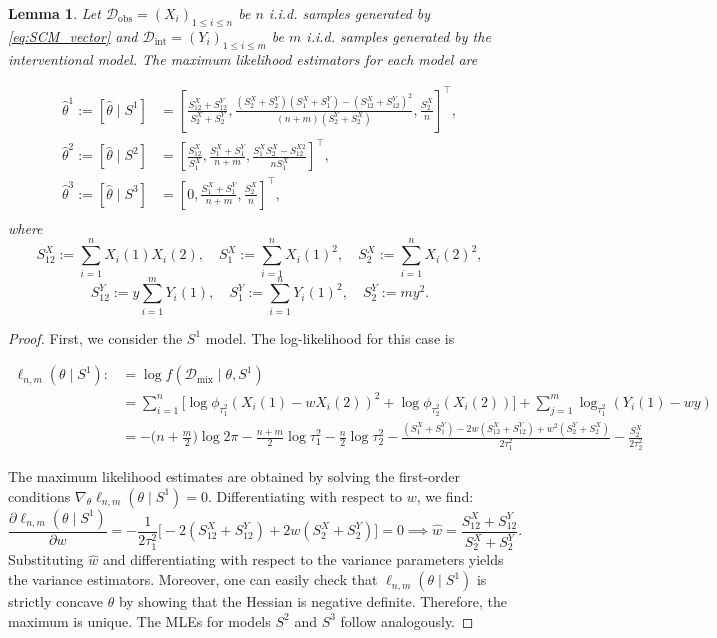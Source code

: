\documentclass[accepted]{uai2026} %
\newcommand{\train}{\mathcal{D}}
\newcommand{\obsdata}{\train_{\text{obs}}}
\newcommand{\mixdata}{\train_{\text{mix}}}
\newcommand{\intdata}{\train_{\text{int}}}
\def\transpose{\intercal}
\newtheorem{lemma}{Lemma}[section]
\theoremstyle{boldremark}
\begin{document}
\begin{lemma}
    \label{lemma:MLEs_ident}
    Let $\obsdata = (X_i)_{1\leq i \leq n}$ be $n$ i.i.d. samples generated by \eqref{eq:SCM_vector} and $\intdata = (Y_i)_{1\leq i \leq m}$ be $m$ i.i.d. samples generated by the interventional model. The maximum likelihood estimators for each model are

    \begin{align*}
        \hat{\theta}^1:= [\hat{\theta} \mid S^1] &= \left[ \frac{S^X_{12}+S_{12}^Y}{S_2^X+S_2^Y},  \frac{(S_2^X+S_2^Y)(S_1^X+S_1^Y)-(S_{12}^X+S_{12}^Y)^2}{(n+m)(S_2^Y+S_2^X)}, \frac{S_2^X}{n}\right]^\transpose,\\
        \hat{\theta}^2:= [\hat{\theta} \mid S^2]  &= \left[\frac{S_{12}^X}{S_1^X}, \frac{S_{1}^X+S_{1}^Y}{n+m}, \frac{S_1^XS_2^X-S_{12}^{X2}}{nS_1^X} \right]^\transpose,\\
        \hat{\theta}^3:= [\hat{\theta} \mid S^3] &= \left[ 0, \frac{S_1^X+S_1^Y}{n+m}, \frac{S_2^X}{n}\right]^\transpose,\\
    \end{align*}
    where
    \begin{equation}
        S^X_{12} := \sum_{i=1}^n X_i(1)X_i(2), \quad S^X_1:= \sum_{i=1}^n X_i(1)^2, \quad S^X_2:= \sum_{i=1}^n X_i(2)^2,
        \label{eq:MLE_interv_X}
    \end{equation}
    \begin{equation}
        S^Y_{12} := y\sum_{i=1}^m Y_i(1), \quad S^Y_1:= \sum_{i=1}^n Y_i(1)^2, \quad S^Y_2:= my^2.
        \label{eq:MLE_interv_Y}
    \end{equation}
\end{lemma}
\begin{proof}
First, we consider the $S^1$ model. The log-likelihood for this case is

\begin{align*}
    \ell_{n,m}(\theta \mid S^1) :&= \log f(\mixdata\mid \theta, S^1) \\
    &= \sum_{i=1}^n \Big[ \log\phi_{\tau_1^2}(X_i(1)-wX_i(2))^2 + \log \phi_{\tau_2^2}(X_i(2)) \Big] + \sum_{j=1}^m \log_{\tau_1^2}(Y_i(1) - wy) \\
    & = -\Big(n+\frac{m}{2}\Big) \log 2\pi -\frac{n+m}{2} \log \tau_1^2 -\frac{n}{2}\log \tau_2^2 -\frac{(S_1^X+S_1^Y)-2w(S_{12}^X+S_{12}^Y) + w^2(S_2^Y+S_2^X)}{2\tau_1^2} - \frac{S_2^X}{2\tau_2^2}
\end{align*}

The maximum likelihood estimates are obtained by solving the first-order conditions $\nabla_{\theta} \ell_{n,m}(\theta\mid  S^1) = 0$. Differentiating with respect to $w$, we find:
\[
\frac{\partial \ell_{n,m}(\theta\mid  S^1)}{\partial w} = -\frac{1}{2\tau_1^2}\Big[-2(S^X_{12}+S_{12}^Y) + 2w(S_2^X+S_2^Y)\Big] = 0 \implies \hat{w} = \frac{S^X_{12}+S_{12}^Y}{S_2^X+S_2^Y}.
\]
Substituting $\hat{w}$ and differentiating with respect to the variance parameters yields the variance estimators. Moreover, one can easily check that $\ell_{n, m}(\theta \mid S^1)$ is strictly concave $\theta$ by showing that the Hessian is negative definite. Therefore, the maximum is unique.  The MLEs for models $S^2$ and $S^3$ follow analogously.
\end{proof}
\end{document}
